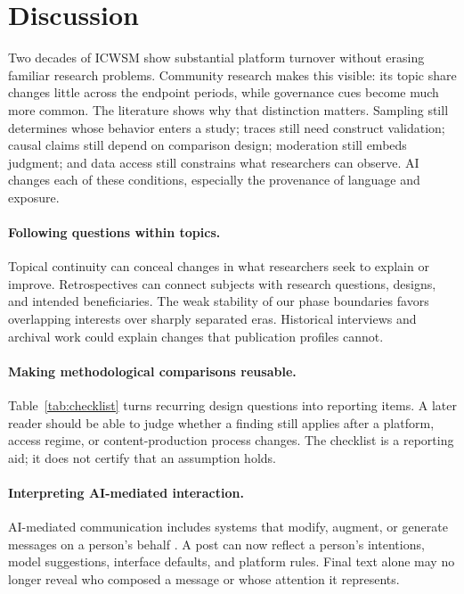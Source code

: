 \section{Discussion}
Two decades of ICWSM show substantial platform turnover without erasing familiar research problems. Community research makes this visible: its topic share changes little across the endpoint periods, while governance cues become much more common. The literature shows why that distinction matters. Sampling still determines whose behavior enters a study; traces still need construct validation; causal claims still depend on comparison design; moderation still embeds judgment; and data access still constrains what researchers can observe. AI changes each of these conditions, especially the provenance of language and exposure.

\paragraph{Following questions within topics.}
Topical continuity can conceal changes in what researchers seek to explain or improve. Retrospectives can connect subjects with research questions, designs, and intended beneficiaries. The weak stability of our phase boundaries favors overlapping interests over sharply separated eras. Historical interviews and archival work could explain changes that publication profiles cannot.

\paragraph{Making methodological comparisons reusable.}
Table~\ref{tab:checklist} turns recurring design questions into reporting items. A later reader should be able to judge whether a finding still applies after a platform, access regime, or content-production process changes. The checklist is a reporting aid; it does not certify that an assumption holds.



\paragraph{Interpreting AI-mediated interaction.}
AI-mediated communication includes systems that modify, augment, or generate messages on a person's behalf \citep{hancock2020}. A post can now reflect a person's intentions, model suggestions, interface defaults, and platform rules. Final text alone may no longer reveal who composed a message or whose attention it represents.

